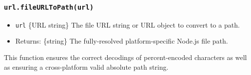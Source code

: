\subsubsection{\texorpdfstring{\texttt{url.fileURLToPath(url)}}{url.fileURLToPath(url)}}\label{url.fileurltopathurl}

\begin{itemize}
\tightlist
\item
  \texttt{url} \{URL \textbar{} string\} The file URL string or URL
  object to convert to a path.
\item
  Returns: \{string\} The fully-resolved platform-specific Node.js file
  path.
\end{itemize}

This function ensures the correct decodings of percent-encoded
characters as well as ensuring a cross-platform valid absolute path
string.

